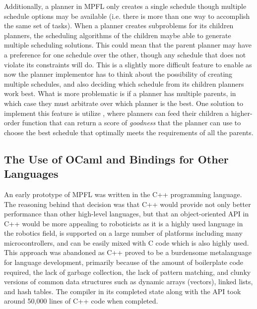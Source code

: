 Additionally, a planner in MPFL only creates a single schedule though multiple schedule options may be available (i.e. there is more than one way to accomplish the same set of tasks). When a planner creates subproblems for its children planners, the scheduling algorithms of the children maybe able to generate multiple scheduling solutions. This could mean that the parent planner may have a preference for one schedule over the other, though any schedule that does not violate its constraints will do. This is a slightly more difficult feature to enable as now the planner implementor has to think about the possibility of creating multiple schedules, and also deciding which schedule from its children planners work best. What is more problematic is if a planner has multiple parents, in which case they must arbitrate over which planner is the best. One solution to implement this feature is utilize , where planners can feed their children a higher-order function that can return a score of \emph{goodness} that the planner can use to choose the best schedule that optimally meets the requirements of all the parents.

\subsection{The Use of OCaml and Bindings for Other Languages}
An early prototype of MPFL was written in the C++ programming language. The reasoning behind that decision was that C++ would provide not only better performance than other high-level languages, but that an object-oriented API in C++ would be more appealing to roboticists as it is a highly used language in the robotics field, is supported on a large number of platforms including many microcontrollers, and can be easily mixed with C code which is also highly used. This approach was abandoned as C++ proved to be a burdensome metalanguage for language development, primarily because of the amount of boilerplate code required, the lack of garbage collection, the lack of pattern matching, and clunky versions of common data structures such as dynamic arrays (vectors), linked lists, and hash tables. The compiler in its completed state along with the API took around 50,000 lines of C++ code when completed. 

